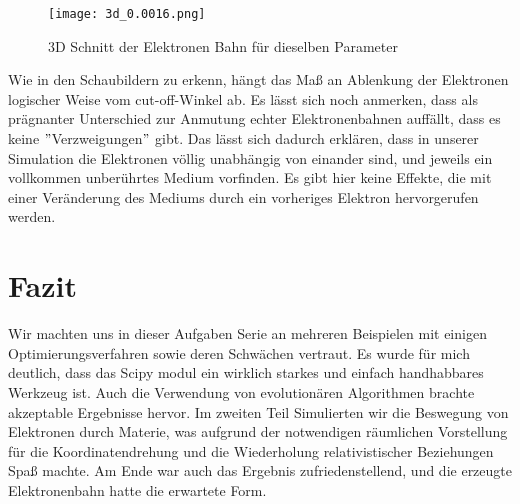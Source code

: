 \documentclass[12pt]{article}
\begin{document}
\begin{figure}[H]\centering\texttt{[image: 3d\_0.0016.png]}\caption{3D Schnitt der  Elektronen Bahn für dieselben Parameter}\end{figure}
        
Wie in den Schaubildern zu erkenn, hängt das Maß an Ablenkung der Elektronen logischer Weise vom cut-off-Winkel ab. Es lässt sich noch anmerken, dass als prägnanter Unterschied zur Anmutung echter Elektronenbahnen auffällt, dass es keine $"$Verzweigungen$"$ gibt. Das lässt sich dadurch erklären, dass in unserer Simulation die Elektronen völlig unabhängig von einander sind, und jeweils ein vollkommen unberührtes Medium vorfinden. Es gibt hier keine Effekte, die mit einer Veränderung des Mediums durch ein vorheriges Elektron hervorgerufen werden.



\section{Fazit}
Wir machten uns in dieser Aufgaben Serie an mehreren Beispielen mit einigen Optimierungsverfahren sowie deren Schwächen vertraut. Es wurde für mich deutlich, dass das Scipy modul ein wirklich starkes und einfach handhabbares Werkzeug ist. Auch die Verwendung von evolutionären Algorithmen brachte akzeptable Ergebnisse hervor. Im zweiten Teil Simulierten wir die Beswegung von Elektronen durch Materie, was aufgrund der notwendigen räumlichen Vorstellung für die Koordinatendrehung und die Wiederholung relativistischer Beziehungen Spaß machte. Am Ende war auch das Ergebnis zufriedenstellend, und die erzeugte Elektronenbahn hatte die erwartete Form.










    
\end{document}
